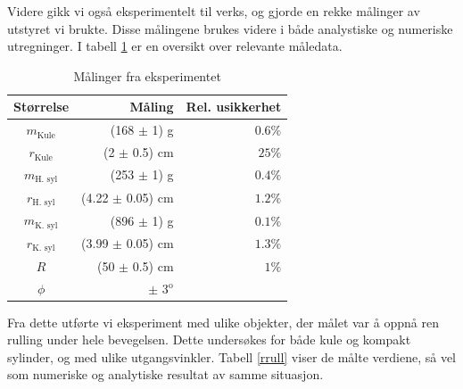 \documentclass[5p]{elsarticle}
\begin{document}
	
	Videre gikk vi også eksperimentelt til verks, og gjorde en rekke målinger av utstyret vi brukte. Disse målingene brukes videre i både analystiske og numeriske utregninger. I tabell \ref{måling} er en oversikt over relevante måledata.
	\begin{table}[H]
	    \centering
	    \begin{tabular}{crr}
	        \hline
            Størrelse  &  Måling  &  Rel. usikkerhet  \\
            \hline
            $m_\text{Kule}$  &  (168 $\pm$ 1) g  &  $0.6\%$  \\
            $r_\text{Kule}$  &  (2 $\pm$ 0.5) cm  &  $25\%$  \\
            $m_\text{H. syl}$  &  (253 $\pm$ 1) g  &  $0.4\%$  \\
            $r_\text{H. syl}$  &  (4.22 $\pm$ 0.05) cm  &  $1.2\%$  \\
            $m_\text{K. syl}$  &  (896 $\pm$ 1) g  &  $0.1\%$  \\
            $r_\text{K. syl}$  &  (3.99 $\pm$ 0.05) cm  &  $1.3\%$  \\
            $R$  &  (50 $\pm$ 0.5) cm  &  $1\%$  \\
            $\phi$  &  $\pm$ 3$^{\text{o}}$ &  \\
            \hline
	    \end{tabular}
	    \caption{Målinger fra eksperimentet}
	    \label{måling}
	\end{table}
	
	Fra dette utførte vi eksperiment med ulike objekter, der målet var å oppnå ren rulling under hele bevegelsen. Dette undersøkes for både kule og kompakt sylinder, og med ulike utgangsvinkler. Tabell \ref{rrull} viser de målte verdiene, så vel som numeriske og analytiske resultat av samme situasjon.
	
\end{document}

